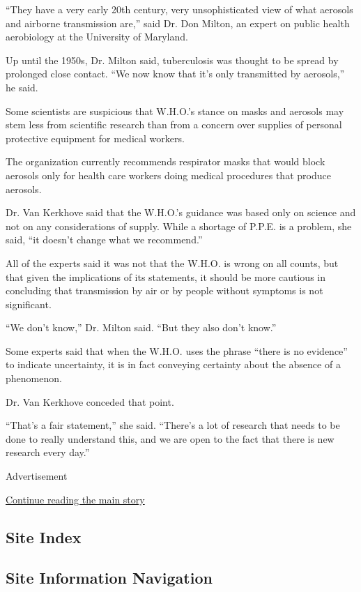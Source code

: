 ``They have a very early 20th century, very unsophisticated view of what
aerosols and airborne transmission are,'' said Dr. Don Milton, an expert
on public health aerobiology at the University of Maryland.

Up until the 1950s, Dr. Milton said, tuberculosis was thought to be
spread by prolonged close contact. ``We now know that it's only
transmitted by aerosols,'' he said.

Some scientists are suspicious that W.H.O.'s stance on masks and
aerosols may stem less from scientific research than from a concern over
supplies of personal protective equipment for medical workers.

The organization currently recommends respirator masks that would block
aerosols only for health care workers doing medical procedures that
produce aerosols.

Dr. Van Kerkhove said that the W.H.O.'s guidance was based only on
science and not on any considerations of supply. While a shortage of
P.P.E. is a problem, she said, ``it doesn't change what we recommend.''

All of the experts said it was not that the W.H.O. is wrong on all
counts, but that given the implications of its statements, it should be
more cautious in concluding that transmission by air or by people
without symptoms is not significant.

``We don't know,'' Dr. Milton said. ``But they also don't know.''

Some experts said that when the W.H.O. uses the phrase ``there is no
evidence'' to indicate uncertainty, it is in fact conveying certainty
about the absence of a phenomenon.

Dr. Van Kerkhove conceded that point.

``That's a fair statement,'' she said. ``There's a lot of research that
needs to be done to really understand this, and we are open to the fact
that there is new research every day.''

Advertisement

\protect\hyperlink{after-bottom}{Continue reading the main story}

\hypertarget{site-index}{%
\subsection{Site Index}\label{site-index}}

\hypertarget{site-information-navigation}{%
\subsection{Site Information
Navigation}\label{site-information-navigation}}

